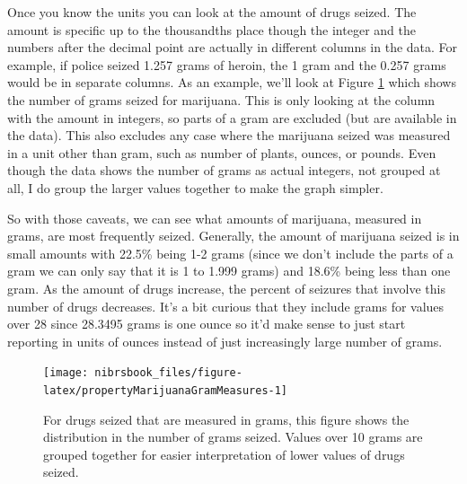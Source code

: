\documentclass[
  12pt,
  openany]{book}
\begin{document}
Once you know the units you can look at the amount of drugs seized. The amount is specific up to the thousandths place though the integer and the numbers after the decimal point are actually in different columns in the data. For example, if police seized 1.257 grams of heroin, the 1 gram and the 0.257 grams would be in separate columns. As an example, we'll look at Figure \ref{fig:propertyMarijuanaGramMeasures} which shows the number of grams seized for marijuana. This is only looking at the column with the amount in integers, so parts of a gram are excluded (but are available in the data). This also excludes any case where the marijuana seized was measured in a unit other than gram, such as number of plants, ounces, or pounds. Even though the data shows the number of grams as actual integers, not grouped at all, I do group the larger values together to make the graph simpler.

So with those caveats, we can see what amounts of marijuana, measured in grams, are most frequently seized. Generally, the amount of marijuana seized is in small amounts with 22.5\% being 1-2 grams (since we don't include the parts of a gram we can only say that it is 1 to 1.999 grams) and 18.6\% being less than one gram. As the amount of drugs increase, the percent of seizures that involve this number of drugs decreases. It's a bit curious that they include grams for values over 28 since 28.3495 grams is one ounce so it'd make sense to just start reporting in units of ounces instead of just increasingly large number of grams.

\begin{figure}

{\centering \texttt{[image: nibrsbook\_files/figure-latex/propertyMarijuanaGramMeasures-1]} 

}

\caption{For drugs seized that are measured in grams, this figure shows the distribution in the number of grams seized. Values over 10 grams are grouped together for easier interpretation of lower values of drugs seized.}\label{fig:propertyMarijuanaGramMeasures}
\end{figure}

  
\end{document}

